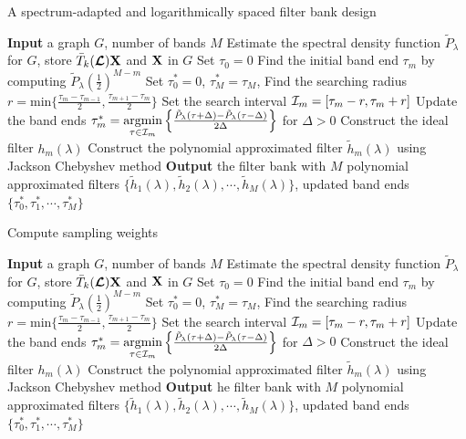 \documentclass[a4paper]{article}
\renewcommand{\L}{\boldsymbol{\mathcal{L}}}
\theoremstyle{definition}
\begin{document}
\begin{algorithm}[h!]
\caption{A spectrum-adapted and logarithmically spaced filter bank design}
\begin{algorithmic}
\State \textbf{Input} a graph $G$, number of bands $M$
\State Estimate the spectral density function $\tilde{P}_{\lambda}$ for $G$, store $\bar{T}_k(\L)\bf{X}$ and $\bf{X}$ in $G$
\State Set $\tau_0 = 0$
\State Find the initial band end $\tau_m$ by computing $\tilde{P}_{\lambda}(\frac{1}{2})^{M-m}$
\EndFor
\State Set $\tau_0^* = 0$, $\tau_M^* = \tau_M$, 
\State Find the searching radius $r = \text{min} \{\frac{\tau_m-\tau_{m-1}}{2}, \frac{\tau_{m+1}-\tau_m}{2}\}$
\State Set the search interval ${\cal I}_m = [\tau_m-r, \tau_m+r]$
\State Update the band ends $\tau_m^* = \underset{\tau \in {\cal I}_m}{\text{argmin}} \left\{\frac{\tilde{P}_{\lambda}(\tau+\Delta)-\tilde{P}_{\lambda}(\tau-\Delta)}{2\Delta}\right\}$ for $\Delta>0$
\EndFor
{}%
\State Construct the ideal filter $h_m(\lambda)$
\State Construct the polynomial approximated filter $\tilde{h}_m(\lambda)$ using Jackson Chebyshev method
\EndFor
\State \textbf{Output} the filter bank with $M$ polynomial approximated filters $\{ \tilde{h}_1(\lambda), \tilde{h}_2(\lambda), \cdots, \tilde{h}_M(\lambda)\}$, updated band ends $\{\tau_0^*, \tau_1^*, \cdots, \tau_M^*\}$
\end{algorithmic}
\label{Al:uniqueness}
\end{algorithm}

\begin{algorithm}[h!]
\caption{Compute sampling weights}
\begin{algorithmic}
\State \textbf{Input} a graph $G$, number of bands $M$
\State Estimate the spectral density function $\tilde{P}_{\lambda}$ for $G$, store $\bar{T}_k(\L)\bf{X}$ and $\bf{X}$ in $G$
\State Set $\tau_0 = 0$
\State Find the initial band end $\tau_m$ by computing $\tilde{P}_{\lambda}(\frac{1}{2})^{M-m}$
\EndFor
\State Set $\tau_0^* = 0$, $\tau_M^* = \tau_M$, 
\State Find the searching radius $r = \text{min} \{\frac{\tau_m-\tau_{m-1}}{2}, \frac{\tau_{m+1}-\tau_m}{2}\}$
\State Set the search interval ${\cal I}_m = [\tau_m-r, \tau_m+r]$
\State Update the band ends $\tau_m^* = \underset{\tau \in {\cal I}_m}{\text{argmin}} \left\{\frac{\tilde{P}_{\lambda}(\tau+\Delta)-\tilde{P}_{\lambda}(\tau-\Delta)}{2\Delta}\right\}$ for $\Delta>0$
\EndFor
{}%
\State Construct the ideal filter $h_m(\lambda)$
\State Construct the polynomial approximated filter $\tilde{h}_m(\lambda)$ using Jackson Chebyshev method
\EndFor
\State \textbf{Output} he filter bank with $M$ polynomial approximated filters $\{ \tilde{h}_1(\lambda), \tilde{h}_2(\lambda), \cdots, \tilde{h}_M(\lambda)\}$, updated band ends $\{\tau_0^*, \tau_1^*, \cdots, \tau_M^*\}$
\end{algorithmic}
\label{Al:uniqueness}
\end{algorithm}
\end{document}
